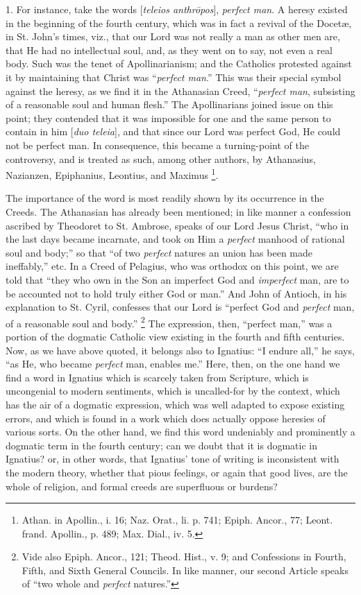 1. For instance, take the words [\emph{teleios anthr\={o}pos}],
\emph{perfect man}. A heresy existed in the beginning of the fourth
century, which was in fact a revival of the Docetæ, in St. John's
times, viz., that our Lord was not really a man as other men are, that
He had no intellectual soul, and, as they went on to say, not even a
real body. Such was the tenet of Apollinarianism; and the Catholics
protested against it by maintaining that Christ was ``\emph{perfect man}.''
This was their special symbol against the heresy, as we find it in the
Athanasian Creed, ``\emph{perfect man}, subsisting of a reasonable soul
and human flesh.'' The Apollinarians joined issue on this point; they
contended that it was impossible for one and the same person to
contain in him [\emph{duo teleia}], and that since our Lord was
perfect God, He could not be perfect man. In consequence, this became
a turning-point of the controversy, and is treated as such, among
other authors, by Athanasius, Nazianzen, Epiphanius, Leontius, and
Maximus \footnote{Athan. in Apollin., i. 16; Naz. Orat., li. p. 741; Epiph. Ancor., 77;
Leont. frand. Apollin., p. 489; Max. Dial., iv. 5.}.

The importance of the word is most readily shown
by its occurrence in the Creeds. The Athanasian has already been
mentioned; in like manner a confession ascribed by Theodoret to St.
Ambrose, speaks of our Lord Jesus Christ, ``who in the last days became
incarnate, and took on Him a \emph{perfect} manhood of rational soul and
body;'' so that ``of two \emph{perfect} natures an union has been made
ineffably,'' etc. In a Creed of Pelagius, who was orthodox on this
point, we are told that ``they who own in the Son an imperfect God and \emph{imperfect}
man, are to be accounted not to hold truly either God or man.'' And
John of Antioch, in his explanation to St. Cyril, confesses that our
Lord is ``perfect God and \emph{perfect} man, of a reasonable soul and
body.'' \footnote{Vide also Epiph. Ancor., 121; Theod. Hist., v. 9; and Confessions in
Fourth, Fifth, and Sixth General Councils. In like manner, our second
Article speaks of ``two whole and \emph{perfect} natures.''} The expression,
then, ``perfect man,'' was a portion of the dogmatic Catholic view
existing in the fourth and fifth centuries. Now, as we have above
quoted, it belongs also to Ignatius: ``I endure all,'' he says, ``as He,
who became \emph{perfect} man, enables me.'' Here, then, on the one
hand we find a word in Ignatius which is scarcely taken from
Scripture, which is uncongenial to modern sentiments, which is
uncalled-for by the context, which has the air of a dogmatic
expression, which was well adapted to expose existing errors, and
which is found in a work which does actually oppose heresies of
various sorts. On the other hand, we find this word undeniably
and prominently a dogmatic term in the fourth century; can we doubt
that it is dogmatic in Ignatius? or, in other words, that Ignatius'
tone of writing is inconsistent with the modern theory, whether that
pious feelings, or again that good lives, are the whole of religion,
and formal creeds are superfluous or burdens?

